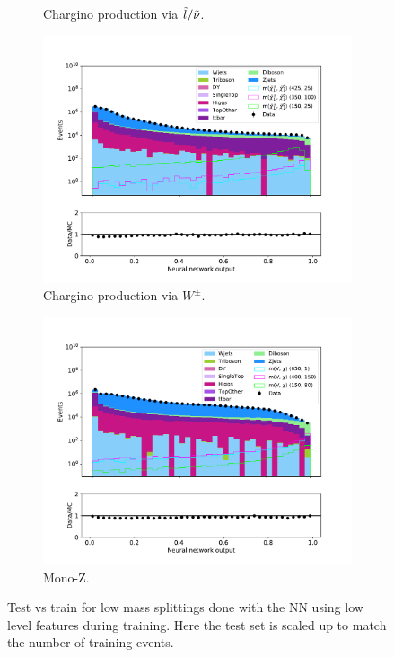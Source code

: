 \begin{figure}[H]
\begin{subfigure}[t!]{0.49\textwidth}
        \caption{Chargino production via $\Tilde{l}/\Tilde{\nu}$.}
        \label{fig:}
    \end{subfigure}      
    \begin{subfigure}[t!]{0.49\textwidth}
        \includegraphics[width = \textwidth]{Figures/Stacked/stackedplot_NN_Low_level_WW.pdf}
        \caption{Chargino production via $W^\pm$.}
        \label{fig:}
    \end{subfigure}
    \begin{subfigure}[t!]{0.49\textwidth}
        \includegraphics[width = \textwidth]{Figures/Stacked/stackedplot_NN_Low_level_monoZ.pdf}
        \caption{Mono-Z.}
        \label{fig:}
    \end{subfigure}
    \caption{Test vs train for low mass splittings done with the NN using low level features during training. Here the test set is scaled up to match the number of training events.}
    \label{fig:}
\end{figure}


